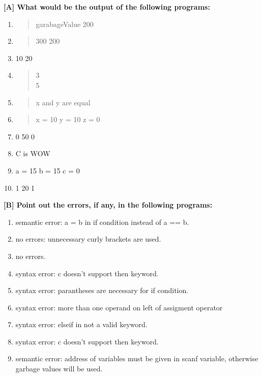 \documentclass{report}
\begin{document}
\textbf{[A] What would be the output of the following programs:}
\begin{enumerate}
    \renewcommand{\labelenumi}{\alph{enumi}}
  \item \begin{quote}
      garabageValue 200\\
  \end{quote}
  \item \begin{quote}
      300 200\\
  \end{quote}
  \item 10 20
  \item \begin{quote}
      3\\
      5\\
  \end{quote}
  \item \begin{quote}
      x and y are equal
  \end{quote}
  \item \begin{quote}
      x = 10 y = 10 z = 0
  \end{quote}
  \item 0 50 0
  \item C is WOW
  \item a = 15 b = 15 c = 0
  \item 1 20 1
\end{enumerate}

\textbf{[B] Point out the errors, if any, in the following programs:}
\begin{enumerate}
    \renewcommand{\labelenumi}{\alph{enumi}}
  \item semantic error: a = b in if condition instead of a == b.
  \item no errors: unnecessary curly brackets are used.
  \item no errors.
  \item syntax error: c doesn't support then keyword.
  \item syntax error: parantheses are necessary for if condition.
  \item syntax error: more than one operand on left of assigment operator
  \item syntax error: elseif in not a valid keyword.
  \item syntax error: c doesn't support then keyword.
  \item semantic error: address of variables must be given in scanf variable, otherwise garbage values will be used.
\end{enumerate}
\end{document}
